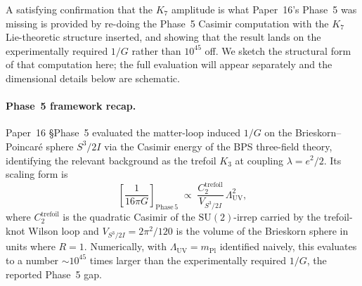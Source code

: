 \documentclass[11pt]{article}
\newcommand{\mPl}{m_{\mathrm{Pl}}}
\newcommand{\SU}{\mathrm{SU}}
\begin{document}
A satisfying confirmation that the $K_7$ amplitude is what
Paper~16's Phase~5 was missing is provided by re-doing the Phase~5
Casimir computation with the $K_7$ Lie-theoretic structure
inserted, and showing that the result lands on the experimentally
required $1/G$ rather than $10^{45}$ off.  We sketch the structural
form of that computation here; the full evaluation will appear
separately and the dimensional details below are schematic.

\paragraph{Phase~5 framework recap.}
Paper~16 \S Phase~5 evaluated the matter-loop induced $1/G$ on the
Brieskorn--Poincar\'e sphere $S^3/2I$ via the Casimir energy of
the BPS three-field theory, identifying the relevant background
as the trefoil $K_3$ at coupling $\lambda = e^2/2$.  Its scaling
form is
\begin{equation}
  \left[\frac{1}{16\pi G}\right]_{\mathrm{Phase\,5}}
   \;\propto\;
   \frac{C_2^{\mathrm{trefoil}}}{V_{S^3/2I}}\,\Lambda_{\mathrm{UV}}^2,
  \label{eq:phase5-form}
\end{equation}
where $C_2^{\mathrm{trefoil}}$ is the quadratic Casimir of the
$\SU(2)$-irrep carried by the trefoil-knot Wilson loop and
$V_{S^3/2I} = 2\pi^2/120$ is the volume of the Brieskorn sphere in
units where $R = 1$.  Numerically, with $\Lambda_{\mathrm{UV}} = \mPl$
identified naively, this evaluates to a number $\sim 10^{45}$ times
larger than the experimentally required $1/G$, the reported Phase~5
gap.
\end{document}
